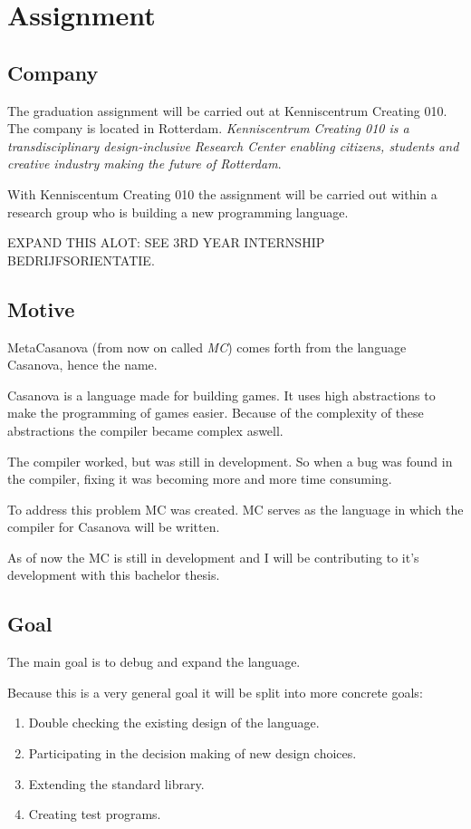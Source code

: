 \chapter{Assignment}
\section{Company}
The graduation assignment will be carried out at Kenniscentrum Creating 010.
The company is located in Rotterdam.
\textit{Kenniscentrum Creating 010 is a transdisciplinary design-inclusive Research Center enabling citizens, students and creative industry making the future of Rotterdam}\cite{creating2016home}.

With Kenniscentum Creating 010 the assignment will be carried out within a research group who is building a new programming language.

EXPAND THIS ALOT: SEE  3RD YEAR INTERNSHIP BEDRIJFSORIENTATIE.

\section{Motive}
MetaCasanova (from now on called \emph{MC}) comes forth from the language Casanova, hence the name.

Casanova is a language made for building games.
It uses high abstractions to make the programming of games easier.
Because of the complexity of these abstractions the compiler became complex aswell.

The compiler worked, but was still in development.
So when a bug was found in the compiler, fixing it was becoming more and more time consuming.

To address this problem MC was created.
MC serves as the language in which the compiler for Casanova will be written.

As of now the MC is still in development and I will be contributing to it's development with this bachelor thesis.

\section{Goal}
The main goal is to debug and expand the language.

Because this is a very general goal it will be split into more concrete goals:
\begin{enumerate}
\item Double checking the existing design of the language.
\item Participating in the decision making of new design choices.
\item Extending the standard library.
\item Creating test programs.
\end{enumerate}

